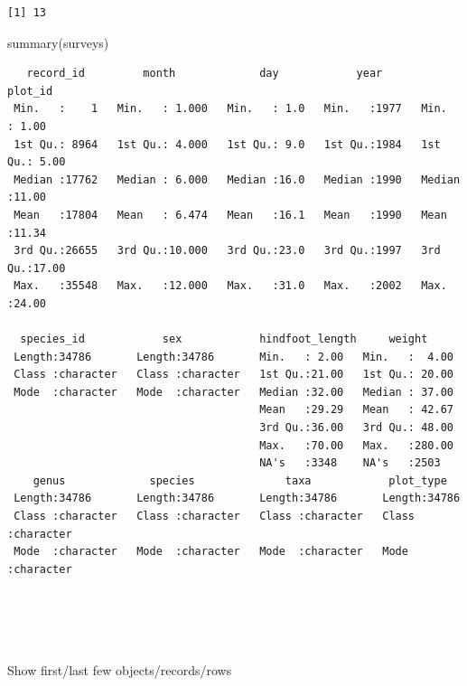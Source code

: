 \documentclass[
  letterpaper,
  DIV=11,
  numbers=noendperiod]{scrreprt}
\newenvironment{Shaded}{\begin{snugshade}}{\end{snugshade}}
\newcommand{\FunctionTok}[1]{\textcolor[rgb]{0.28,0.35,0.67}{#1}}
\newcommand{\NormalTok}[1]{\textcolor[rgb]{0.00,0.23,0.31}{#1}}
\begin{document}
\begin{verbatim}
[1] 13
\end{verbatim}

\begin{Shaded}
\begin{Highlighting}[]
\FunctionTok{summary}\NormalTok{(surveys)}
\end{Highlighting}
\end{Shaded}

\begin{verbatim}
   record_id         month             day            year         plot_id     
 Min.   :    1   Min.   : 1.000   Min.   : 1.0   Min.   :1977   Min.   : 1.00  
 1st Qu.: 8964   1st Qu.: 4.000   1st Qu.: 9.0   1st Qu.:1984   1st Qu.: 5.00  
 Median :17762   Median : 6.000   Median :16.0   Median :1990   Median :11.00  
 Mean   :17804   Mean   : 6.474   Mean   :16.1   Mean   :1990   Mean   :11.34  
 3rd Qu.:26655   3rd Qu.:10.000   3rd Qu.:23.0   3rd Qu.:1997   3rd Qu.:17.00  
 Max.   :35548   Max.   :12.000   Max.   :31.0   Max.   :2002   Max.   :24.00  
                                                                               
  species_id            sex            hindfoot_length     weight      
 Length:34786       Length:34786       Min.   : 2.00   Min.   :  4.00  
 Class :character   Class :character   1st Qu.:21.00   1st Qu.: 20.00  
 Mode  :character   Mode  :character   Median :32.00   Median : 37.00  
                                       Mean   :29.29   Mean   : 42.67  
                                       3rd Qu.:36.00   3rd Qu.: 48.00  
                                       Max.   :70.00   Max.   :280.00  
                                       NA's   :3348    NA's   :2503    
    genus             species              taxa            plot_type        
 Length:34786       Length:34786       Length:34786       Length:34786      
 Class :character   Class :character   Class :character   Class :character  
 Mode  :character   Mode  :character   Mode  :character   Mode  :character  
                                                                            
                                                                            
                                                                            
                                                                            
\end{verbatim}

Show first/last few objects/records/rows
\end{document}
